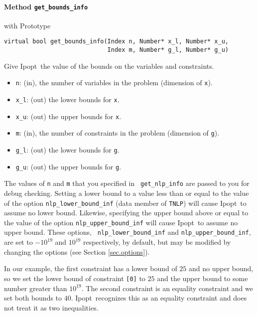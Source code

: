 \documentclass[letter,10pt]{article}
\newcommand{\Ipopt}{{\sc Ipopt}}
\begin{document}
\paragraph{Method {\texttt{get\_bounds\_info}}} with Prototype
\begin{verbatim}
virtual bool get_bounds_info(Index n, Number* x_l, Number* x_u,
                             Index m, Number* g_l, Number* g_u)
\end{verbatim}
Give \Ipopt\ the value of the bounds on the variables and constraints.
\begin{itemize}
\item {\tt n}: (in), the number of variables in the problem (dimension of {\tt x}). 
\item {\tt x\_l}: (out) the lower bounds for {\tt x}. 
\item {\tt x\_u}: (out) the upper bounds for {\tt x}.
\item {\tt m}: (in), the number of constraints in the problem (dimension of {\tt g}).
\item {\tt g\_l}: (out) the lower bounds for {\tt g}. 
\item {\tt g\_u}: (out) the upper bounds for {\tt g}.
\end{itemize}
The values of {\tt n} and {\tt m} that you specified in {\tt
  get\_nlp\_info} are passed to you for debug checking.  Setting a
lower bound to a value less than or equal to the value of the option
{\tt nlp\_lower\_bound\_inf} (data member of {\tt TNLP}) will cause
\Ipopt\ to assume no lower bound. Likewise, specifying the upper bound
above or equal to the value of the option {\tt nlp\_upper\_bound\_inf}
will cause \Ipopt\ to assume no upper bound.  These options, {\tt
  nlp\_lower\_bound\_inf} and {\tt nlp\_upper\_bound\_inf}, are set to
$-10^{19}$ and $10^{19}$ respectively, by default, but may be modified
by changing the options (see Section \ref{sec.options}).

In our example, the first constraint has a lower bound of $25$ and no upper
bound, so we set the lower bound of constraint {\tt [0]} to $25$ and
the upper bound to some number greater than $10^{19}$. The second
constraint is an equality constraint and we set both bounds to
$40$. \Ipopt\ recognizes this as an equality constraint and does not
treat it as two inequalities.
\end{document}

